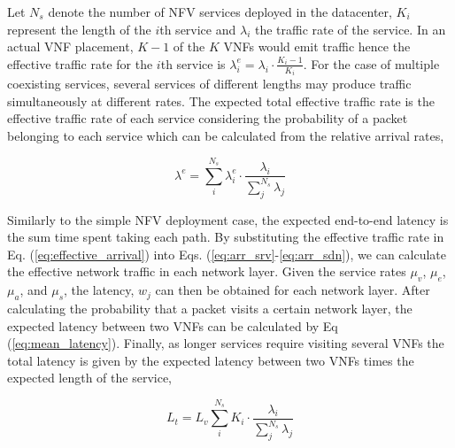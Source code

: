Let $N_s$ denote the number of NFV services deployed in the datacenter, $K_i$ represent the length of the $i$th service and $\lambda_i$ the traffic rate of the service. In an actual VNF placement, $K-1$ of the $K$ VNFs would emit traffic hence the effective traffic rate for the $i$th service is $\lambda_{i}^{e} = \lambda_{i} \cdot \frac{K_i-1}{K_i}$. For the case of multiple coexisting services, several services of different lengths may produce traffic simultaneously at different rates. The expected total effective traffic rate is the effective traffic rate of each service considering the probability of a packet belonging to each service which can be calculated from the relative arrival rates,

\begin{equation}
    \label{eq:effective_arrival}
    \lambda^e = \sum_i^{N_s} \lambda_i^e \cdot \frac{\lambda_i}{\sum_j^{N_s} \lambda_j}
\end{equation}

Similarly to the simple NFV deployment case, the expected end-to-end latency is the sum time spent taking each path. By substituting the effective traffic rate in Eq. (\ref{eq:effective_arrival}) into Eqs. (\ref{eq:arr_srv}-\ref{eq:arr_sdn}), we can calculate the effective network traffic in each network layer. Given the service rates $\mu_v$, $\mu_e$, $\mu_a$, and $\mu_s$, the latency, $w_j$ can then be obtained for each network layer. After calculating the probability that a packet visits a certain network layer, the expected latency between two VNFs can be calculated by Eq (\ref{eq:mean_latency}). Finally, as longer services require visiting several VNFs the total latency is given by the expected latency between two VNFs times the expected length of the service,

\begin{equation}
    \label{eq:total_network_latency}
    L_t = L_v \sum_i^{N_s} K_i \cdot \frac{\lambda_i}{\sum_j^{N_s} \lambda_j}
\end{equation}